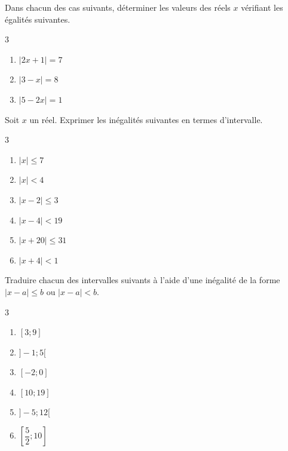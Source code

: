 {\begin{Exercice}
Dans chacun des cas suivants, déterminer les valeurs des réels $x$ vérifiant les égalités suivantes.
\vspace{-0.5cm}
\begin{multicols}{3}
\begin{enumerate}
    \item $|2x + 1| = 7$
    \item $|3 - x| = 8$
    \item $|5 - 2x| = 1$
\end{enumerate}
\end{multicols}
\end{Exercice}

\begin{Exercice}
Soit $x$ un réel. Exprimer les inégalités suivantes en termes d'intervalle.
\vspace{-0.5cm}
\begin{multicols}{3}
\begin{enumerate}
    \item $|x| \leq 7$
    \item $|x| < 4$
    \item $|x - 2| \leq 3$
    \item $|x - 4| < 19$
    \item $|x + 20| \leq 31$
    \item $|x + 4| < 1$
\end{enumerate}
\end{multicols}
\end{Exercice}

\begin{Exercice}
Traduire chacun des intervalles suivants à l'aide d'une inégalité de la forme $|x - a| \leq b$ ou $|x - a| < b$.
\vspace{-0.5cm}
\begin{multicols}{3}
\begin{enumerate}
    \item $[3 ; 9]$
    \item $]-1 ; 5[$
    \item $[-2 ; 0]$
    \item $[10 ; 19]$
    \item $]-5 ; 12[$
    \item $[\dfrac{5}{2} ; 10]$
\end{enumerate}
\end{multicols}
\end{Exercice}


}
